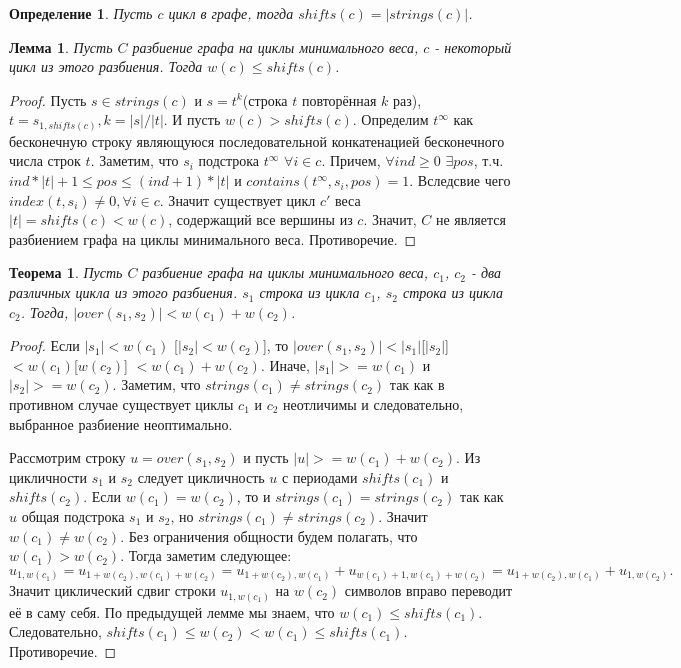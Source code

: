 \documentclass[a4paper,10pt]{article}
\newtheorem{theorem}{Теорема}
\newtheorem{lemma}{Лемма}
\newtheorem{definition}{Определение}
\begin{document}
\begin{definition}
Пусть $c$ цикл в графе, тогда $shifts(c) = |strings(c)|$.
\end{definition}

\begin{lemma}
Пусть $C$ разбиение графа на циклы минимального веса, $c$ - некоторый цикл из этого разбиения.
Тогда $w(c) \leq shifts(c)$.
\end{lemma}

\begin{proof}
Пусть $s \in strings(c)$ и $s = t^k$(строка $t$ повторённая $k$ раз), $t = s_{1, shifts(c)}, k = |s| / |t|$.
И пусть $w(c) > shifts(c)$.
Определим $t^\infty$ как бесконечную строку являющуюся последовательной конкатенацией бесконечного числа строк $t$.
Заметим, что $s_i$ подстрока $t^\infty$ $\forall i \in c$. Причем, $\forall ind \geq 0$ $\exists pos$, т.ч. $ind * |t| + 1 \leq pos \leq (ind + 1) * |t|$
и $contains(t^\infty, s_i, pos) = 1$. 
Вследсвие чего $index(t, s_i) \ne 0, \forall i \in c$. Значит существует цикл $c'$ веса $|t| = shifts(c) < w(c)$, содержащий все вершины из $c$.
Значит, $C$ не является разбиением графа на циклы минимального веса. Противоречие.
\end{proof}

\begin{theorem}
Пусть $C$ разбиение графа на циклы минимального веса, $c_1$, $c_2$ - два различных цикла из этого разбиения.
$s_1$ строка из цикла $c_1$, $s_2$ строка из цикла $c_2$. Тогда, $|over(s_1, s_2)| < w(c_1) + w(c_2)$.
\end{theorem}

\begin{proof}
Если $|s_1| < w(c_1)$ [$|s_2| < w(c_2)$], то $|over(s_1, s_2)| < |s_1|$[$|s_2|$] $< w(c_1)$[$w(c_2)$] $< w(c_1) + w(c_2)$.
Иначе, $|s_1| >= w(c_1)$ и $|s_2| >= w(c_2)$. 
Заметим, что $strings(c_1) \ne strings(c_2)$ так как в противном случае существует циклы $c_1$ и $c_2$ неотличимы 
и следовательно, выбранное разбиение неоптимально.

Рассмотрим строку $u = over(s_1, s_2)$ и пусть $|u| >= w(c_1) + w(c_2)$.
Из цикличности $s_1$ и $s_2$ следует цикличность $u$ с периодами $shifts(c_1)$ и $shifts(c_2)$.
Если $w(c_1) = w(c_2)$, то и $strings(c_1) = strings(c_2)$ так как $u$ общая подстрока $s_1$ и $s_2$, но $strings(c_1) \ne strings(c_2)$.
Значит $w(c_1) \ne w(c_2)$. Без ограничения общности будем полагать, что $w(c_1) > w(c_2)$.
Тогда заметим следующее:
\[
	u_{1, w(c_1)} = 
	u_{1 + w(c_2), w(c_1) + w(c_2)} = 
	u_{1 + w(c_2), w(c_1)} + u_{w(c_1) + 1, w(c_1) + w(c_2)} = 
	u_{1 + w(c_2), w(c_1)} + u_{1, w(c_2)}.
\]
Значит циклический сдвиг строки $u_{1, w(c_1)}$ на $w(c_2)$ символов вправо переводит её в саму себя.
По предыдущей лемме мы знаем, что $w(c_1) \leq shifts(c_1)$.
Следовательно, $shifts(c_1) \leq w(c_2) < w(c_1) \leq shifts(c_1)$. 
Противоречие.
\end{proof}
\end{document}
